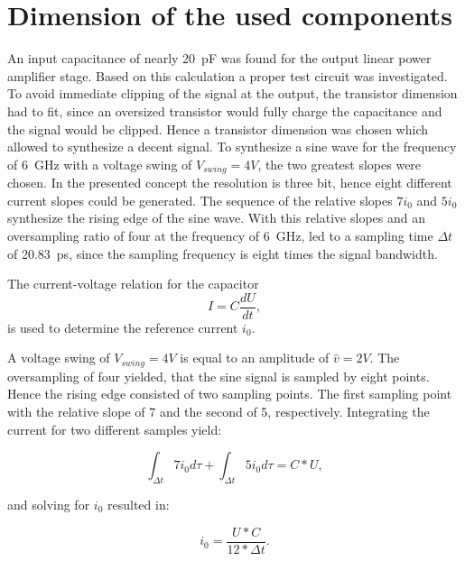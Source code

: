\section{Dimension of the used components}
An input capacitance of nearly \SI{20}{\pico \farad} was found for the output linear power amplifier stage.
Based on this calculation a proper test circuit was investigated.
To avoid immediate clipping of the signal at the output, the transistor dimension had to fit, since an oversized transistor would fully charge the capacitance and the signal would be clipped.
Hence a transistor dimension was chosen which allowed to synthesize a decent signal.
To synthesize a sine wave for the frequency of \SI{6}{\giga \hertz} with a voltage swing of $V_{swing} = 4V$, the two greatest slopes were chosen.
In the presented concept the resolution is three bit, hence eight different current slopes could be generated.
The sequence of the relative slopes $7 i_0$ and $5 i_0$ synthesize the rising edge of the sine wave.
With this relative slopes and an oversampling ratio of four at the frequency of \SI{6}{\giga \hertz}, led to a sampling time $\Delta t$ of \SI{20.83}{\pico \second}, since the sampling frequency is eight times the signal bandwidth.

The current-voltage relation for the capacitor
\begin{equation}
	I = C \frac{d U}{d t},
\end{equation}
is used to determine the reference current $i_0$.

A voltage swing of $V_{swing} = 4V$ is equal to an amplitude of $\hat{v} = 2V$.
The oversampling of four yielded, that the sine signal is sampled by eight points.
Hence the rising edge consisted of two sampling points.
The first sampling point with the relative slope of 7 and the second of 5, respectively.
Integrating the current for two different samples yield:

\begin{equation}
\int_{\Delta t} 7 i_0 d\tau + \int_{\Delta t} 5 i_0 d \tau = C*U,
\end{equation}

and solving for $i_0$ resulted in:

\begin{equation}
i_0 = \frac{U*C}{12*\Delta t}.
\end{equation}

